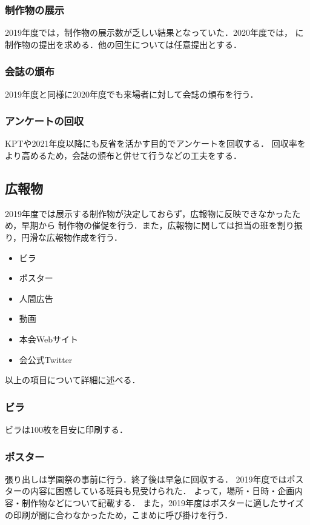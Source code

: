 \subsubsection*{制作物の展示}
2019年度では，制作物の展示数が乏しい結果となっていた．2020年度では，\secondGrade{}
に制作物の提出を求める．他の回生については任意提出とする．

\subsubsection*{会誌の頒布}
2019年度と同様に2020年度でも来場者に対して会誌の頒布を行う．

\subsubsection*{アンケートの回収}
KPTや2021年度以降にも反省を活かす目的でアンケートを回収する．
回収率をより高めるため，会誌の頒布と併せて行うなどの工夫をする．

\subsection*{広報物}
2019年度では展示する制作物が決定しておらず，広報物に反映できなかったため，早期から
制作物の催促を行う．また，広報物に関しては担当の班を割り振り，円滑な広報物作成を行う．
\begin{itemize}
    \item ビラ
    \item ポスター
    \item 人間広告
    \item 動画
    \item 本会Webサイト
    \item 会公式Twitter
\end{itemize}
以上の項目について詳細に述べる．
\subsubsection*{ビラ}
ビラは100枚を目安に印刷する．

\subsubsection*{ポスター}
張り出しは学園祭の事前に行う．終了後は早急に回収する．
2019年度ではポスターの内容に困惑している班員も見受けられた．
よって，場所・日時・企画内容・制作物などについて記載する．
また，2019年度はポスターに適したサイズの印刷が間に合わなかったため，こまめに呼び掛けを行う．

